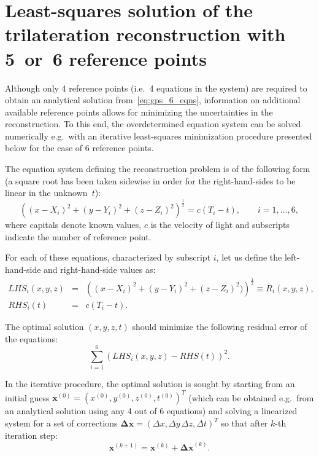 \chapter{Least-squares solution of the trilateration reconstruction with 5~or~6 reference points}\label{appendix:numerical_6_equations}

Although only 4 reference points (i.e.~4 equations in the system) are required to obtain an analytical solution from~\ref{eq:gps_6_eqns}, information on additional available reference points allows for minimizing the uncertainties in the reconstruction. To this end, the overdetermined equation system can be solved numerically e.g.\ with an iterative least-squares minimization procedure presented below for the case of 6 reference points.

The equation system defining the reconstruction problem is of the following form (a square root has been taken sidewise in order for the right-hand-sides to be linear in the unknown~$t$):
\begin{equation}
  \label{eq:numerical_6_equations}
  \left((x-X_i)^2 + (y-Y_i)^2 + (z-Z_i)^2 \right)^{\frac{1}{2}} = c(T_i-t), \qquad i=1,\ldots,6,
\end{equation}
where capitals denote known values, $c$ is the velocity of light and subscripts indicate the number of reference point.

For each of these equations, characterized by subscript $i$, let us define the left-hand-side and right-hand-side values as:
\begin{eqnarray}
  \label{eq:numerical_lhs_rhs}
  LHS_i(x,y,z) &=& \left( (x-X_i)^2 + (y-Y_i)^2 + (z-Z_i)^2) \right)^{\frac{1}{2}} \equiv R_i(x,y,z),   \label{eq:numerical_lhs} \\
  RHS_i(t) &=& c(T_i-t).   \label{eq:numerical_rhs}
\end{eqnarray}

The optimal solution $(x,y,z,t)$ should minimize the following residual error of the equations:
\begin{equation}
  \label{eq:numerical_residual}
  \sum_{i=1}^{6} \left(LHS_i(x,y,z) - RHS(t)\right)^2.
\end{equation}

In the iterative procedure, the optimal solution is sought by starting from an initial guess $\mathbf{x}^{(0)} = (x^{(0)},y^{(0)},z^{(0)},t^{(0)})^T$ (which can be obtained e.g.\ from an analytical solution using any 4 out of 6 equations) and solving a linearized system for a set of corrections \mbox{$\mathbf{\Delta x} = (\Delta x, \Delta y\, \Delta z, \Delta t)^T$} so that after $k$-th iteration step:
\begin{equation}
  \label{eq:numerical_corrections}
  \mathbf{x}^{(k+1)} = \mathbf{x}^{(k)} + \mathbf{\Delta x}^{(k)}.
\end{equation}

